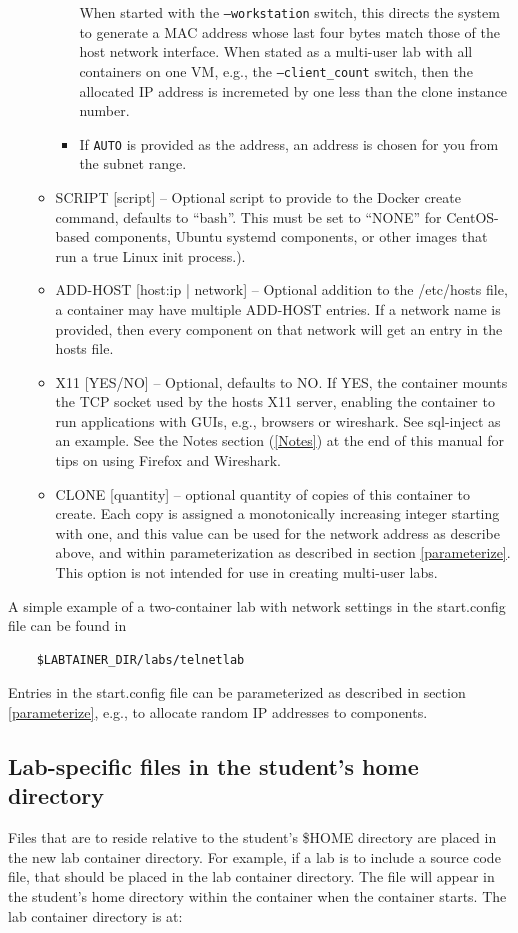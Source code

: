 \documentclass[12pt]{article}
\begin{document}
\begin{itemize}
\begin{itemize}
\begin{itemize}
When started with the {\tt --workstation} switch, this directs the system to generate a MAC address whose last four bytes match 
those of the host network interface.  When stated as a multi-user lab with all containers on one VM, e.g., the 
{\tt --client\_count} switch, then the allocated IP address is incremeted by one less than the clone instance number.
\item If {\tt AUTO} is provided as the address, an address is chosen for you from the subnet range.  
\end{itemize}
\item SCRIPT [script] -- Optional script to provide to the Docker create command, defaults to ``bash''.  This must be set to
``NONE'' for CentOS-based components, Ubuntu systemd components, or other images that run a true Linux init process.).
\item ADD-HOST [host:ip | network] -- Optional addition to the /etc/hosts file, a container may have multiple ADD-HOST entries.
If a network name is provided, then every component on that network will get an entry in the hosts file.
\item X11 [YES/NO] -- Optional, defaults to NO.  If YES, the container mounts the TCP socket used by the hosts X11 server,
enabling the container to run applications with GUIs, e.g., browsers or wireshark.  See sql-inject as an example.  See the
Notes section (\ref{Notes}) at the end of this manual for tips on using Firefox and Wireshark.
\item CLONE [quantity] -- optional quantity of copies of this container to create. Each copy is assigned a monotonically
increasing integer starting with one, and this value can be used for the network address as describe above, and within
parameterization as described in section \ref{parameterize}. This option is not intended for use in creating multi-user
labs.

\end{itemize}
\end{itemize}
  
A simple example of a two-container lab with network settings in the start.config file can be found in 
\begin{verbatim}
    $LABTAINER_DIR/labs/telnetlab
\end{verbatim}
Entries in the start.config file can be parameterized as described in section \ref{parameterize}, e.g., to allocate
random IP addresses to components.


\subsection {Lab-specific files in the student's home directory}
\label{home files}
Files that are to reside relative to the student's \$HOME directory are placed in the 
new lab container directory.  For example, if a lab is to include a source code file, that
should be placed in the lab container directory. The file will appear in the student's
home directory within the container when the container starts.  The lab container
directory is at:  
\end{document}
